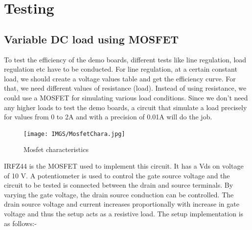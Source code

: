

\chapter{Testing}

\section{Variable DC load using MOSFET}
To test the efficiency of the demo boards, different tests like line regulation, load regulation etc have to be conducted. For line regulation, at a certain constant load, we should create a voltage values table and get the efficiency curve. For that, we need different values of resistance (load). Instead of using resistance, we could use a MOSFET for simulating various load conditions. Since we don’t need any higher loads to test the demo boards, a circuit that simulate a load precisely for values from 0 to 2A and with a precision of 0.01A will do the job.

\begin{figure}[h]
	\centering
	\texttt{[image: IMGS/MosfetChara.jpg]}
	\caption{Mosfet characteristics}
	\label{fig:arch}
\end{figure} 

IRFZ44 is the MOSFET used to implement this circuit. It has a Vds on voltage of 10 V. A potentiometer is used to control the gate source voltage and the circuit to be tested is connected between the drain and source terminals. By varying the gate voltage, the drain source conduction can be controlled. The drain source voltage and current increases proportionally with increase in gate voltage and thus the setup acts as a resistive load. The setup implementation is as follows:-

